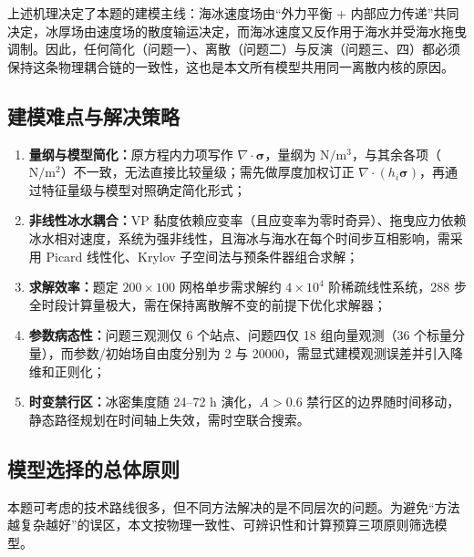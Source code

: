 \documentclass[UTF8,fontset=none]{ctexart}
\newcommand{\vect}[1]{\boldsymbol{#1}}
\begin{document}
上述机理决定了本题的建模主线：海冰速度场由“外力平衡 + 内部应力传递”共同决定，冰厚场由速度场的散度输运决定，而海冰速度又反作用于海水并受海水拖曳调制。因此，任何简化（问题一）、离散（问题二）与反演（问题三、四）都必须保持这条物理耦合链的一致性，这也是本文所有模型共用同一离散内核的原因。

\subsection{建模难点与解决策略}

\begin{enumerate}
\item \textbf{量纲与模型简化：}原方程内力项写作 $\nabla\cdot\vect\sigma$，量纲为 $\mathrm{N/m^3}$，与其余各项（$\mathrm{N/m^2}$）不一致，无法直接比较量级；需先做厚度加权订正 $\nabla\cdot(h_i\vect\sigma)$，再通过特征量级与模型对照确定简化形式；
\item \textbf{非线性冰水耦合：}VP 黏度依赖应变率（且应变率为零时奇异）、拖曳应力依赖冰水相对速度，系统为强非线性，且海冰与海水在每个时间步互相影响，需采用 Picard 线性化、Krylov 子空间法与预条件器组合求解；
\item \textbf{求解效率：}题定 $200\times100$ 网格单步需求解约 $4\times10^4$ 阶稀疏线性系统，288 步全时段计算量极大，需在保持离散解不变的前提下优化求解器；
\item \textbf{参数病态性：}问题三观测仅 6 个站点、问题四仅 18 组向量观测（36 个标量分量），而参数/初始场自由度分别为 2 与 20000，需显式建模观测误差并引入降维和正则化；
\item \textbf{时变禁行区：}冰密集度随 24--72 h 演化，$A>0.6$ 禁行区的边界随时间移动，静态路径规划在时间轴上失效，需时空联合搜索。
\end{enumerate}

\subsection{模型选择的总体原则}

本题可考虑的技术路线很多，但不同方法解决的是不同层次的问题。为避免“方法越复杂越好”的误区，本文按物理一致性、可辨识性和计算预算三项原则筛选模型。
\end{document}

